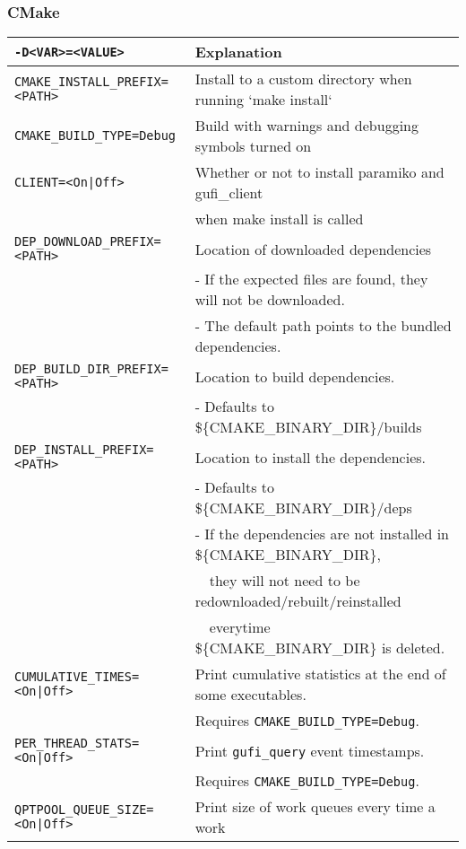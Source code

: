 \subsubsection{CMake}
\begin{tabular} {| l | l |}
  \hline
  \texttt{-D<VAR>=<VALUE>} & Explanation \\
  \hline
  \texttt{CMAKE\_INSTALL\_PREFIX=<PATH>} & Install to a custom directory
  when running `make install` \\
  \hline
  \texttt{CMAKE\_BUILD\_TYPE=Debug} & Build with warnings and debugging
  symbols turned on \\
  \hline
  \texttt{CLIENT=<On|Off>} & Whether or not to install paramiko and
  gufi\_client \\
  & when make install is called \\
  \hline
  \texttt{DEP\_DOWNLOAD\_PREFIX=<PATH>} & Location of downloaded
  dependencies \\
  & - If the expected files are
  found, they will not be downloaded. \\
  & - The default path points to
  the bundled dependencies. \\
  \hline
  \texttt{DEP\_BUILD\_DIR\_PREFIX=<PATH>} & Location to build
  dependencies. \\
  & - Defaults to
  \$\{CMAKE\_BINARY\_DIR\}/builds \\
  \hline
  \texttt{DEP\_INSTALL\_PREFIX=<PATH>} &  Location to install the
  dependencies.  \\
  & - Defaults to
  \$\{CMAKE\_BINARY\_DIR\}/deps\\
  & - If the dependencies are not
  installed in \$\{CMAKE\_BINARY\_DIR\}, \\
  & \ \ they will not need to be
  redownloaded/rebuilt/reinstalled \\
  & \ \ everytime
  \$\{CMAKE\_BINARY\_DIR\} is deleted. \\
  \hline
  \texttt{CUMULATIVE\_TIMES=<On|Off>} & Print cumulative statistics at
  the end of some executables. \\
  & Requires
  \texttt{CMAKE\_BUILD\_TYPE=Debug}. \\
  \hline
  \texttt{PER\_THREAD\_STATS=<On|Off>} & Print \texttt{gufi\_query}
  event timestamps.\\
  & Requires
  \texttt{CMAKE\_BUILD\_TYPE=Debug}. \\
  \hline
  \texttt{QPTPOOL\_QUEUE\_SIZE=<On|Off>} & Print size of work queues
  every time a work \\

\end{tabular}
